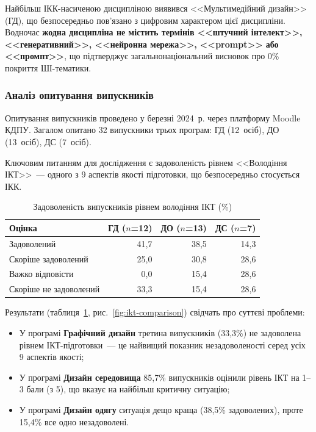 Найбільш ІКК-насиченою дисципліною виявився <<Мультимедійний дизайн>> (ГД), що безпосередньо пов'язано з цифровим характером цієї дисципліни. Водночас \textbf{жодна дисципліна не містить термінів <<штучний інтелект>>, <<генеративний>>, <<нейронна мережа>>, <<prompt>> або <<промпт>>}, що підтверджує загальнонаціональний висновок про 0\% покриття ШІ-тематики.

\subsubsection{Аналіз опитування випускників}\label{sssec:2.2.3}

Опитування випускників проведено у березні 2024~р. через платформу Moodle КДПУ. Загалом опитано 32 випускники трьох програм: ГД (12~осіб), ДО (13~осіб), ДС (7~осіб).

Ключовим питанням для дослідження є задоволеність рівнем <<Володіння ІКТ>>~--- одного з 9 аспектів якості підготовки, що безпосередньо стосується ІКК.

\begin{table}[htbp]
\centering
\caption{Задоволеність випускників рівнем володіння ІКТ (\%)}\label{tab:ikt-satisfaction}
\small
\begin{tabularx}{\textwidth}{@{}Xrrr@{}}
\toprule
\textbf{Оцінка} & \textbf{ГД ($n$=12)} & \textbf{ДО ($n$=13)} & \textbf{ДС ($n$=7)} \\
\midrule
Задоволений & 41,7 & 38,5 & 14,3 \\
Скоріше задоволений & 25,0 & 30,8 & 28,6 \\
Важко відповісти & 0,0 & 15,4 & 28,6 \\
Скоріше не задоволений & 33,3 & 15,4 & 28,6 \\
\bottomrule
\end{tabularx}
\end{table}

Результати (таблиця~\ref{tab:ikt-satisfaction}, рис.~\ref{fig:ikt-comparison}) свідчать про суттєві проблеми:
\begin{itemize}
    \item У програмі \textbf{Графічний дизайн} третина випускників (33,3\%) не задоволена рівнем ІКТ-підготовки~--- це найвищий показник незадоволеності серед усіх 9 аспектів якості;
    \item У програмі \textbf{Дизайн середовища} 85,7\% випускників оцінили рівень ІКТ на 1--3 бали (з 5), що вказує на найбільш критичну ситуацію;
    \item У програмі \textbf{Дизайн одягу} ситуація дещо краща (38,5\% задоволених), проте 15,4\% все одно незадоволені.
\end{itemize}

